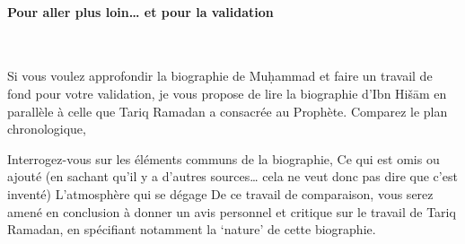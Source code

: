 \paragraph{Pour aller plus loin\ldots{} et pour la
validation}\




{Si vous voulez approfondir la biographie
de Muḥammad et faire un travail de fond pour votre validation, je vous
propose de lire la biographie d'Ibn Hišām en parallèle à celle que Tariq
Ramadan a consacrée au Prophète.
}
Comparez le plan chronologique,

Interrogez-vous sur les éléments communs de la
biographie,
Ce qui est omis ou ajouté (en sachant qu'il y a d'autres
sources\ldots{} cela ne veut donc pas dire que c'est
inventé) L'atmosphère qui se
dégage
De ce travail de comparaison, vous serez
amené en conclusion à donner un avis personnel et critique sur le
travail de Tariq Ramadan, en spécifiant notamment la `nature' de cette
biographie.



